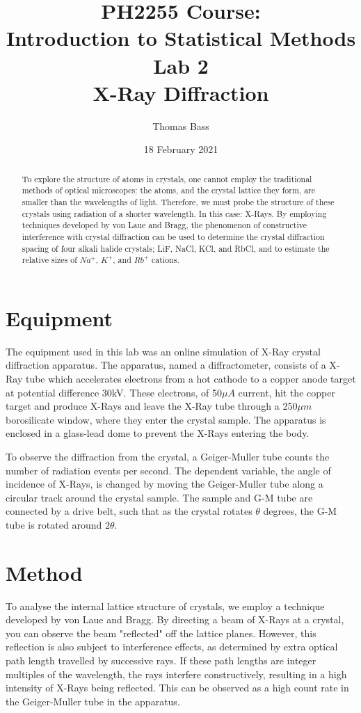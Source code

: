 \documentclass[a4paper]{article}
\title{PH2255 Course:\\
Introduction to Statistical Methods\\Lab 2\\X-Ray Diffraction}
\author{Thomas Bass}
\date{18 February 2021}
\begin{document}
\maketitle

\begin{abstract}
To explore the structure of atoms in crystals, one cannot employ the traditional methods of optical microscopes: the atoms, and the crystal lattice they form, are smaller than the wavelengths of light. Therefore, we must probe the structure of these crystals using radiation of a shorter wavelength. In this case: X-Rays. By employing techniques developed by von Laue and Bragg, the phenomenon of constructive interference with crystal diffraction can be used to determine the crystal diffraction spacing of four alkali halide crystals; LiF, NaCl, KCl, and RbCl, and to estimate the relative sizes of $Na^+$, $K^+$, and $Rb^+$ cations.
\end{abstract}

\section{Equipment}

The equipment used in this lab was an online simulation of X-Ray crystal diffraction apparatus. The apparatus, named a diffractometer, consists of a X-Ray tube which accelerates electrons from a hot cathode to a copper anode target at potential difference 30kV. These electrons, of 50$\mu A$ current, hit the copper target and produce X-Rays and leave the X-Ray tube through a 250$\mu m$ borosilicate window, where they enter the crystal sample. The apparatus is enclosed in a glass-lead dome to prevent the X-Rays entering the body.

To observe the diffraction from the crystal, a Geiger-Muller tube counts the number of radiation events per second. The dependent variable, the angle of incidence of X-Rays, is changed by moving the Geiger-Muller tube along a circular track around the crystal sample. The sample and G-M tube are connected by a drive belt, such that as the crystal rotates $\theta$ degrees, the G-M tube is rotated around $2\theta$.

\section{Method}

To analyse the internal lattice structure of crystals, we employ a technique developed by von Laue and Bragg. By directing a beam of X-Rays at a crystal, you can observe the beam "reflected" off the lattice planes. However, this reflection is also subject to interference effects, as determined by extra optical path length travelled by successive rays. If these path lengths are integer multiples of the wavelength, the rays interfere constructively, resulting in a high intensity of X-Rays being reflected. This can be observed as a high count rate in the Geiger-Muller tube in the apparatus. 
\end{document}
